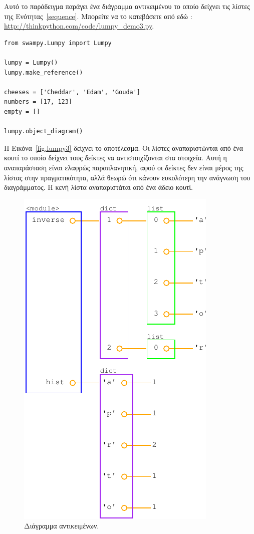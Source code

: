 \documentclass[10pt]{book}
\begin{document}
Αυτό το παράδειγμα παράγει ένα διάγραμμα αντικειμένου το οποίο δείχνει τις λίστες 
της Ενότητας~\ref{sequence}.  Μπορείτε να το κατεβάσετε από εδώ : 
\url{http://thinkpython.com/code/lumpy_demo3.py}.
 

\begin{verbatim}
from swampy.Lumpy import Lumpy

lumpy = Lumpy()
lumpy.make_reference()

cheeses = ['Cheddar', 'Edam', 'Gouda']
numbers = [17, 123]
empty = []

lumpy.object_diagram()
\end{verbatim}

 Η Εικόνα~\ref{fig.lumpy3} δείχνει το αποτέλεσμα.  Οι λίστες αναπαριστώνται 
από ένα κουτί το οποίο δείχνει τους δείκτες να αντιστοιχίζονται στα στοιχεία.  Αυτή 
η αναπαράσταση είναι ελαφρώς παραπλανητική, αφού οι δείκτες δεν είναι μέρος της λίστας στην πραγματικότητα, αλλά θεωρώ ότι κάνουν ευκολότερη την ανάγνωση του διαγράμματος.  Η κενή λίστα αναπαριστάται από ένα άδειο κουτί.

\begin{figure}
\centerline
{\includegraphics[scale=0.7]{figs/lumpydemo4.pdf}}
\caption{Διάγραμμα αντικειμένων.}
\label{fig.lumpy4}
\end{figure}
\end{document}
